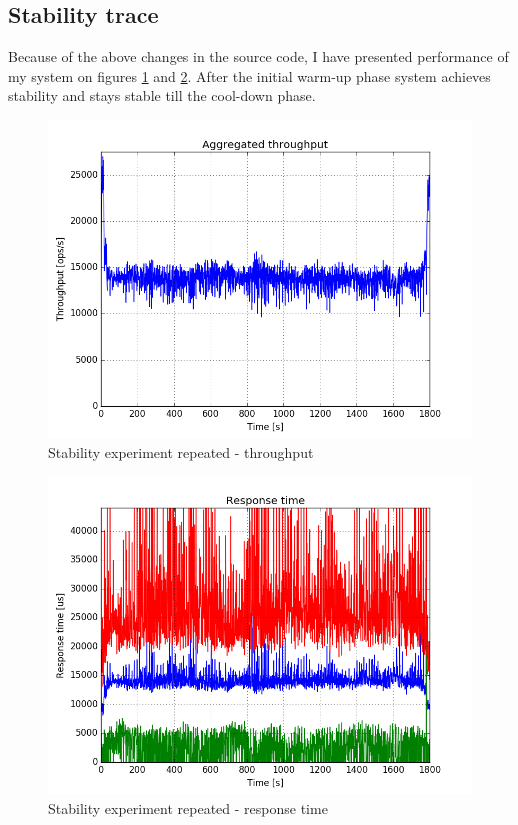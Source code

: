 \documentclass[11pt]{article}
\begin{document}
\subsection{Stability trace}

Because of the above changes in the source code, I have presented performance of my system on figures \ref{fig:mm1-throughput} and \ref{fig:mm1-response-time}. After the initial warm-up phase system achieves stability and stays stable till the cool-down phase.

\begin{figure}
\centering
\includegraphics[width=0.95\linewidth]{plots/mm1_throughput}
\caption{Stability experiment repeated - throughput}
\label{fig:mm1-throughput}
\end{figure}

\begin{figure}
\centering
\includegraphics[width=0.95\linewidth]{plots/mm1_response_time}
\caption{Stability experiment repeated - response time}
\label{fig:mm1-response-time}
\end{figure}
\end{document}
